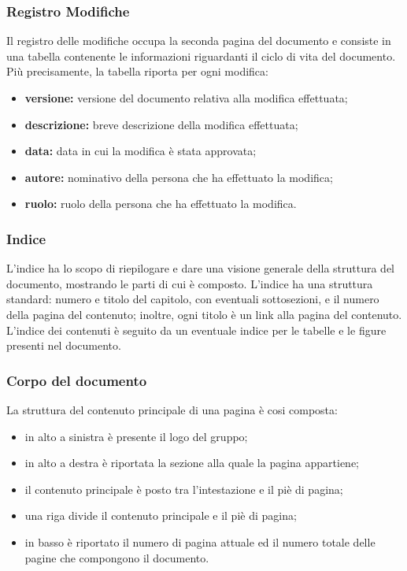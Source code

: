\subsubsection{Registro Modifiche}
Il registro delle modifiche occupa la seconda pagina del documento e consiste in una tabella contenente le informazioni riguardanti il ciclo di vita del documento.
\\Più precisamente, la tabella riporta per ogni modifica: 
\begin{itemize}
\item \textbf{versione:} versione del documento relativa alla modifica effettuata;
	\item \textbf{descrizione:} breve descrizione della modifica effettuata;
		\item \textbf{data:} data in cui la modifica è stata approvata;
			\item \textbf{autore:} nominativo della persona che ha effettuato la modifica; 
				\item \textbf{ruolo:} ruolo della persona che ha effettuato la modifica. 
\end{itemize}
\subsubsection{Indice}
L'indice ha lo scopo di riepilogare e dare una visione generale della struttura del documento, mostrando le parti di cui è composto. L'indice ha una struttura standard: numero e titolo del capitolo, con eventuali sottosezioni, e il numero della pagina del contenuto; inoltre, ogni titolo è un link alla pagina del contenuto. L'indice dei contenuti è seguito da un eventuale indice per le tabelle e le figure presenti nel documento.
\subsubsection{Corpo del documento}
La struttura del contenuto principale di una pagina è cosi composta:
\begin{itemize}
\item in alto a sinistra è presente il logo del gruppo;
	\item in alto a destra è riportata la sezione alla quale la pagina appartiene;
		\item il contenuto principale è posto tra l'intestazione e il piè di pagina;
			\item una riga divide il contenuto principale e il piè di pagina;
				\item in basso è riportato il numero di pagina attuale ed il numero totale delle pagine che compongono il documento.
\end{itemize}
